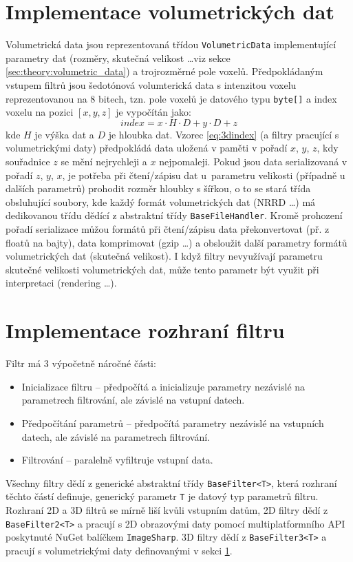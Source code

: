 \section{Implementace volumetrických dat}
\label{sec:impl:volumetric_data}
Volumetrická data jsou reprezentovaná třídou \texttt{VolumetricData} implementující parametry dat (rozměry, skutečná velikost \dots viz sekce \ref{sec:theory:volumetric_data}) a trojrozměrné pole voxelů. Předpokládaným vstupem filtrů jsou šedotónová volumterická data s intenzitou voxelu reprezentovanou na 8 bitech, tzn. pole voxelů je datového typu \texttt{byte[]} a index voxelu na pozici $[x, y, z]$ je vypočítán jako:
\begin{equation}
    \label{eq:3dindex}
    index = x \cdot H \cdot D + y \cdot D + z
\end{equation}
kde $H$ je výška dat a $D$ je hloubka dat. Vzorec \ref{eq:3dindex} (a filtry pracující s volumetrickými daty) předpokládá data uložená v paměti v pořadí $x$, $y$, $z$, kdy souřadnice $z$ se mění nejrychleji a $x$ nejpomaleji. Pokud jsou data serializovaná v pořadí $z$, $y$, $x$, je potřeba při čtení/zápisu dat u~parametru velikosti (případně u dalších parametrů) prohodit rozměr hloubky s šířkou, o to se stará třída obsluhující soubory, kde každý formát volumetrických dat (NRRD \dots) má dedikovanou třídu dědící z abstraktní třídy \texttt{BaseFileHandler}. Kromě prohození pořadí serializace můžou  formátů při čtení/zápisu data překonvertovat (př. z floatů na bajty), data komprimovat (gzip \dots) a obsloužit další parametry formátů volumetrických dat (skutečná velikost).
I když filtry nevyužívají parametru skutečné velikosti volumetrických dat, může tento parametr být využit při interpretaci (rendering \dots).

\section{Implementace rozhraní filtru}
\label{sec:impl:filter}
Filtr má 3 výpočetně náročné části:
\begin{itemize}
    \item Inicializace filtru -- předpočítá a inicializuje parametry nezávislé na parametrech filtrování, ale závislé na vstupní datech.
    \item Předpočítání parametrů -- předpočítá parametry nezávislé na vstupních datech, ale závislé na parametrech filtrování.
    \item Filtrování -- paralelně vyfiltruje vstupní data.
\end{itemize}
Všechny filtry dědí z generické abstraktní třídy \texttt{BaseFilter<T>}, která rozhraní těchto částí definuje, generický parametr \texttt{T} je datový typ parametrů filtru. Rozhraní 2D a 3D filtrů se mírně liší kvůli vstupním datům, 2D filtry dědí z \texttt{BaseFilter2<T>} a pracují s 2D obrazovými daty pomocí multiplatformního API poskytnuté NuGet balíčkem \texttt{ImageSharp}. 3D filtry dědí z \texttt{BaseFilter3<T>} a pracují s volumetrickými daty definovanými v sekci \ref{sec:impl:volumetric_data}. 

